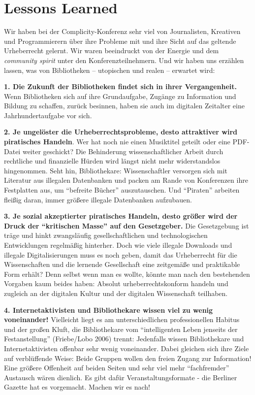 \documentclass[a4paper,
fontsize=11pt,
oneside,
numbers=noperiodatend,
parskip=half-,
bibliography=totoc,
final
]{scrartcl}
\begin{document}
\section*{Lessons Learned}\label{lessons-learned}

Wir haben bei der Complicity-Konferenz sehr viel von Journalisten,
Kreativen und Programmierern über ihre Probleme mit und ihre Sicht auf
das geltende Urheberrecht gelernt. Wir waren beeindruckt von der Energie
und dem \emph{community spirit} unter den Konferenzteilnehmern. Und wir
haben uns erzählen lassen, was von Bibliotheken -- utopischen und realen
-- erwartet wird:

\textbf{1. Die Zukunft der Bibliotheken findet sich in ihrer
Vergangenheit.} Wenn Bibliotheken sich auf ihre Grundaufgabe, Zugänge zu
Information und Bildung zu schaffen, zurück besinnen, haben sie auch im
digitalen Zeitalter eine Jahrhundertaufgabe vor sich.

\textbf{2. Je ungelöster die Urheberrechtsprobleme, desto attraktiver
wird piratisches Handeln}. Wer hat noch nie einen Musiktitel geteilt
oder eine PDF-Datei weiter geschickt? Die Behinderung wissenschaftlicher
Arbeit durch rechtliche und finanzielle Hürden wird längst nicht mehr
widerstandslos hingenommen. Seht hin, Bibliothekare: Wissenschaftler
versorgen sich mit Literatur aus illegalen Datenbanken und packen am
Rande von Konferenzen ihre Festplatten aus, um \enquote{befreite Bücher}
auszutauschen. Und \enquote{Piraten} arbeiten fleißig daran, immer
größere illegale Datenbanken aufzubauen.

\textbf{3. Je sozial akzeptierter piratisches Handeln, desto größer wird
der Druck der \enquote{kritischen Masse} auf den Gesetzgeber.} Die
Gesetzgebung ist träge und hinkt zwangsläufig gesellschaftlichen und
technologischen Entwicklungen regelmäßig hinterher. Doch wie viele
illegale Downloads und illegale Digitalisierungen muss es noch geben,
damit das Urheberrecht für die Wissenschaften und die lernende
Gesellschaft eine zeitgemäße und praktikable Form erhält? Denn selbst
wenn man es wollte, könnte man nach den bestehenden Vorgaben kaum beides
haben: Absolut urheberrechtskonform handeln und zugleich an der
digitalen Kultur und der digitalen Wissenschaft teilhaben.

\textbf{4. Internetaktivisten und Bibliothekare wissen viel zu wenig
voneinander!} Vielleicht liegt es am unterschiedlichen professionellen
Habitus und der großen Kluft, die Bibliothekare vom
\enquote{intelligenten Leben jenseits der Festanstellung} (Friebe/Lobo
2006) trennt: Jedenfalls wissen Bibliothekare und Internetaktivisten
offenbar sehr wenig voneinander. Dabei gleichen sich ihre Ziele auf
verblüffende Weise: Beide Gruppen wollen den freien Zugang zur
Information! Eine größere Offenheit auf beiden Seiten und sehr viel mehr
\enquote{fachfremder} Austausch wären dienlich. Es gibt dafür
Veranstaltungsformate - die Berliner Gazette hat es vorgemacht. Machen
wir es nach!
\end{document}
